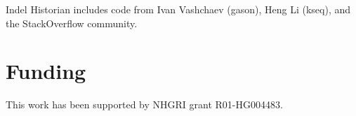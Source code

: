 \documentclass{bioinfo}
\begin{document}
Indel Historian includes code from Ivan Vashchaev (gason), Heng Li (kseq), %
and the StackOverflow community.

\section*{Funding}

This work has been supported by NHGRI grant R01-HG004483.


%
%
%
%
%
%
%
%



\end{document}
